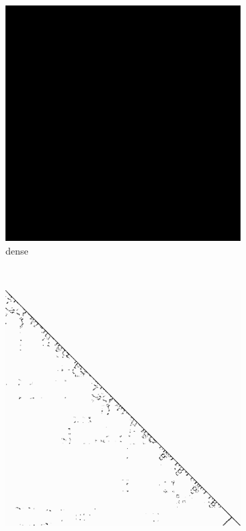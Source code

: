 \begin{figure}
\begin{multicols}{4}
\begin{subfigure}{\linewidth}
\includegraphics[width=\linewidth]{images/dense}
\caption{dense}
\end{subfigure}~%
\begin{subfigure}{\linewidth}
\includegraphics[width=\linewidth]{images/pdb1HYS}

\end{subfigure}
\end{multicols}
\end{figure}
